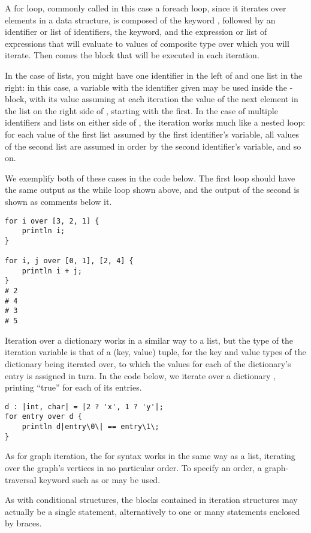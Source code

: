A for loop, commonly called in this case a foreach loop, since it iterates over elements in a data structure, is composed of the keyword , followed by an identifier or list of identifiers, the  keyword, and the expression or list of expressions that will evaluate to values of composite type over which you will iterate. Then comes the block that will be executed in each iteration.

In the case of lists, you might have one identifier in the left of  and one list in the right: in this case, a variable with the identifier given may be used inside the -block, with its value assuming at each iteration the value of the next element in the list on the right side of , starting with the first. In the case of multiple identifiers and lists on either side of , the iteration works much like a nested loop: for each value of the first list assumed by the first identifier's variable, all values of the second list are assumed in order by the second identifier's variable, and so on.

We exemplify both of these cases in the code below. The first loop should have the same output as the while loop shown above, and the output of the second is shown as comments below it.
\begin{lstlisting}[language=Gryph]
for i over [3, 2, 1] {
	println i;
}

for i, j over [0, 1], [2, 4] {
	println i + j;
}
# 2 
# 4 
# 3 
# 5 
\end{lstlisting}

Iteration over a dictionary works in a similar way to a list, but the type of the iteration variable is that of a (key, value) tuple, for the key and value types of the dictionary being iterated over, to which the values for each of the dictionary's entry is assigned in turn. In the code below, we iterate over a dictionary , printing ``true'' for each of its entries.

\begin{lstlisting}[language=Gryph]
d : |int, char| = |2 ? 'x', 1 ? 'y'|;
for entry over d {
	println d|entry\0\| == entry\1\;
}
\end{lstlisting}

As for graph iteration, the for syntax works in the same way as a list, iterating over the graph's vertices in no particular order. To specify an order, a graph-traversal keyword such as  or  may be used.


As with conditional structures, the blocks contained in iteration structures may actually be a single statement, alternatively to one or many statements enclosed by braces.
